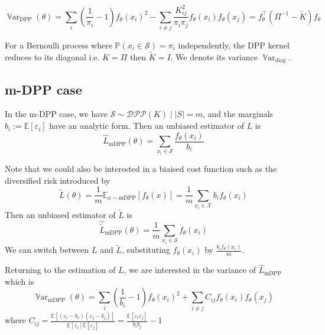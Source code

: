 \documentclass{article} %
\renewcommand{\epsilon}{\varepsilon}
\newcommand{\PP}{\mathbb{P}}
\newcommand{\EE}{\mathbb{E}}
\newcommand{\Var}{\operatorname{\mathbb V ar}}
\newcommand{\T}{^\top}  %
\newcommand{\1}{\mathds{1}} %
\theoremstyle{definition} %
\begin{document}
\begin{equation}
	\Var_{\textrm{DPP}}(\theta)=\sum_{i}\left(\frac{1}{\pi_{i}}-1\right) f_\theta(x_{i})^{2}-\sum_{i \neq j} \frac{K_{ij}^{2}}{\pi_{i} \pi_{j}} f_\theta(x_{i}) f_\theta(x_{j}) =  f_\theta\T (\Pi^{-1}  - \tilde{K}) f_\theta 
\end{equation}

For a Bernoulli process where $\PP(x_i \in \mathcal S) = \pi_i$ independently, the DPP kernel reduces to its diagonal i.e. $K = \Pi$ then $\tilde K = I$. We denote its variance $\Var_{\textrm{diag}}$.


\subsection{m-DPP case}

In the m-DPP case, we have $\mathcal S \sim \mathcal{DPP}(K) \mid |S|=m$, and the marginals $b_{i} := \mathbb{E}\left[\epsilon_{i}\right]$ have an analytic form. Then an unbiased estimator of $L$ is
\begin{equation*}
	\hat L_{\textrm{mDPP}}(\theta) = \sum_{x_i\in \mathcal S} \frac{f_\theta(x_i)}{b_i}
\end{equation*}

Note that we could also be interested in a biaised cost function such as the diversified risk introduced by \cite{zhang2017dppminibatch}
$$
\tilde L(\theta) =\frac{1}{m}\EE_{x \sim \textrm{mDPP}}[f_\theta(x)]=\frac{1}{m}\sum_{x_i \in \mathcal X} b_{i} f_\theta\left(x_{i}\right)
$$
Then an unbiased estimator of $\tilde L$ is
\begin{equation*}
	\hat{\tilde L}_{\textrm{mDPP}}(\theta) = \frac{1}{m}\sum_{x_i\in \mathcal S} f_\theta(x_i)
\end{equation*}
We can switch between $L$ and $\tilde L$, substituting $f_\theta(x_i)$ by $\frac{b_i f_\theta(x_i)}{m}$.

Returning to the estimation of $L$, we are interested in the variance of $\hat L_{\textrm{mDPP}}$ which is
\begin{equation}
	\Var_{\textrm{mDPP}}(\theta)=\sum_{i}\left(\frac{1}{b_i}-1\right) f_\theta(x_i)^2
	+ \sum_{i \neq j} C_{ij}f_\theta(x_i) f_\theta(x_j)
\end{equation}
where $C_{ij}=\frac{\mathbb{E}\left[\left(\epsilon_{i}-b_{i}\right)\left(\epsilon_{j}-b_{j}\right)\right]}{\mathbb{E}\left[\epsilon_{i}\right] \mathbb{E}\left[\epsilon_{j}\right]}=\frac{\mathbb{E}\left[\epsilon_{i} \epsilon_{j}\right]}{b_{i} b_{j}}-1
$
\end{document}
